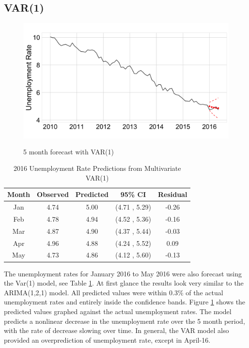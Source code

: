 \documentclass[twoside,twocolumn]{article}
\begin{document}
\subsection{VAR(1)}

   \begin{figure}[htb]
    	\centering
     	\caption{5 month forecast with VAR(1)}
     	\includegraphics[width=\linewidth]{images/varpred}
     	\label{fig:varpred}
 \end{figure}
 
\begin{table}[ht]
\centering
\small
\caption{2016 Unemployment Rate Predictions from Multivariate VAR(1)}
\label{tab:varforecast}
\begin{tabular}{ccccc}
  \hline
Month & Observed & Predicted& 95\% CI  & Residual \\ 
  \hline
Jan  & 4.74 & 5.00 & (4.71 , 5.29) & -0.26 \\ 
Feb & 4.78 & 4.94 & (4.52 , 5.36) & -0.16 \\ 
Mar  & 4.87 & 4.90 & (4.37 , 5.44) & -0.03 \\ 
Apr & 4.96 & 4.88 & (4.24 , 5.52) & 0.09 \\ 
May & 4.73 & 4.86 & (4.12 , 5.60) & -0.13 \\ 
   \hline
\end{tabular}
\end{table}

The unemployment rates for January 2016 to May 2016 were also forecast using the Var(1) model, see Table \ref{tab:varforecast}.  At first glance the results look very similar to the ARIMA(1,2,1) model. All predicted values were within 0.3\% of the actual unemployment rates and entirely inside the confidence bands.  Figure \ref{fig:varpred} shows the predicted values graphed against the actual unemployment rates. The model predicts a nonlinear decrease in the unemployment rate over the 5 month period, with the rate of decrease slowing over time.  In general, the VAR model also provided an overprediction of unemployment rate, except in April-16. 
\end{document}
